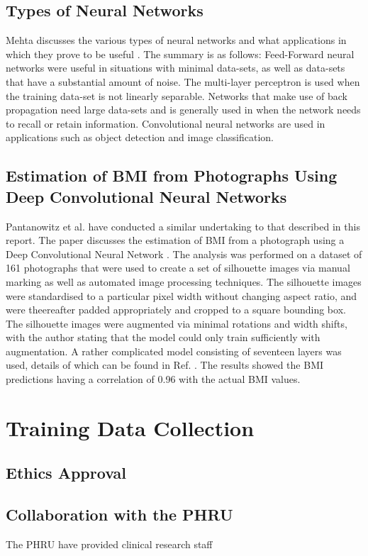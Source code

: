 \documentclass[conference]{IEEEtran}
\begin{document}
\subsection{Types of Neural Networks}
Mehta discusses the various types of neural networks and what applications in which they prove to be useful \cite{mehta_2019}. 
The summary is as follows:
Feed-Forward neural networks were useful in situations with minimal data-sets, as well as data-sets that have a substantial amount of noise.
The multi-layer perceptron is used when the training data-set is not linearly separable.
Networks that make use of back propagation need large data-sets and is generally used in when the network needs to recall or retain information.
Convolutional neural networks are used in applications such as object detection and image classification.

\subsection{Estimation of BMI from Photographs Using Deep Convolutional Neural Networks}
Pantanowitz et al. have conducted a similar undertaking to that described in this report.
The paper discusses the estimation of BMI from a photograph using a Deep Convolutional Neural Network \cite{bmifromphoto}.
The analysis was performed on a dataset of 161 photographs that were used to create a set of silhouette images via manual marking as well as automated image processing techniques.
The silhouette images were standardised to a particular pixel width without changing aspect ratio, and were theereafter padded appropriately and cropped to a square bounding box.
The silhouette images were augmented via minimal rotations and width shifts, with the author stating that the model could only train sufficiently with augmentation.
A rather complicated model consisting of seventeen layers was used, details of which can be found in Ref. \cite{bmifromphoto}.
The results showed the BMI predictions having a correlation of 0.96 with the actual BMI values.

\section{Training Data Collection}
\subsection{Ethics Approval}
\subsection{Collaboration with the PHRU}
The PHRU have provided clinical research staff
\end{document}
